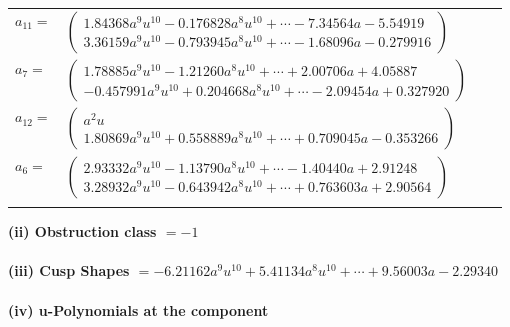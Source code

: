 \documentclass[1p]{elsarticle_modified}
\theoremstyle{definition}
\begin{document}
\begin{tabular}{m{7pt} m{180pt} m{7pt} m{180pt} }
\flushright $a_{11}=$&$\begin{pmatrix}1.84368 a^{9} u^{10}-0.176828 a^{8} u^{10}+\cdots-7.34564 a-5.54919\\3.36159 a^{9} u^{10}-0.793945 a^{8} u^{10}+\cdots-1.68096 a-0.279916\end{pmatrix}$ \\
\flushright $a_{7}=$&$\begin{pmatrix}1.78885 a^{9} u^{10}-1.21260 a^{8} u^{10}+\cdots+2.00706 a+4.05887\\-0.457991 a^{9} u^{10}+0.204668 a^{8} u^{10}+\cdots-2.09454 a+0.327920\end{pmatrix}$ \\
\flushright $a_{12}=$&$\begin{pmatrix}a^2 u\\1.80869 a^{9} u^{10}+0.558889 a^{8} u^{10}+\cdots+0.709045 a-0.353266\end{pmatrix}$ \\
\flushright $a_{6}=$&$\begin{pmatrix}2.93332 a^{9} u^{10}-1.13790 a^{8} u^{10}+\cdots-1.40440 a+2.91248\\3.28932 a^{9} u^{10}-0.643942 a^{8} u^{10}+\cdots+0.763603 a+2.90564\end{pmatrix}$\\&\end{tabular}
\flushleft \textbf{(ii) Obstruction class $= -1$}\\~\\
\flushleft \textbf{(iii) Cusp Shapes $= -6.21162 a^{9} u^{10}+5.41134 a^{8} u^{10}+\cdots+9.56003 a-2.29340$}\\~\\
\newpage\renewcommand{\arraystretch}{1}
\flushleft \textbf{(iv) u-Polynomials at the component}\newline \\
\end{document}
